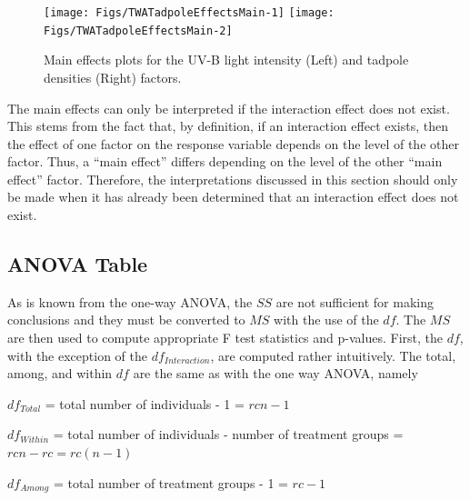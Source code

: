 \documentclass[10pt,openany]{book}\usepackage[]{graphicx}\usepackage[]{color}
\newenvironment{knitrout}{}{} %
\begin{document}
\begin{knitrout}
\color{fgcolor}\begin{figure}[!h]

{\centering \texttt{[image: Figs/TWATadpoleEffectsMain-1]} 
\texttt{[image: Figs/TWATadpoleEffectsMain-2]} 

}

\caption[Main effects plots for the UV-B light intensity (Left) and tadpole densities (Right) factors]{Main effects plots for the UV-B light intensity (Left) and tadpole densities (Right) factors.}\label{fig:TWATadpoleEffectsMain}
\end{figure}


\end{knitrout}

The main effects can only be interpreted if the interaction effect does not exist.  This stems from the fact that, by definition, if an interaction effect exists, then the effect of one factor on the response variable depends on the level of the other factor.  Thus, a ``main effect'' differs depending on the level of the other ``main effect'' factor.  Therefore, the interpretations discussed in this section should only be made when it has already been determined that an interaction effect does not exist.


\subsection{ANOVA Table}
As is known from the one-way ANOVA, the $SS$ are not sufficient for making conclusions and they must be converted to $MS$ with the use of the $df$.  The $MS$ are then used to compute appropriate F test statistics and p-values.  First, the $df$, with the exception of the $df_{Interaction}$, are computed rather intuitively.  The total, among, and within $df$ are the same as with the one way ANOVA, namely
\begin{Itemize}
  \item $df_{Total}$ = total number of individuals - 1 = $rcn-1$
  \item $df_{Within}$ = total number of individuals - number of treatment groups = $rcn - rc = rc(n-1)$
  \item $df_{Among}$ = total number of treatment groups - 1 = $rc-1$
\end{Itemize}
\end{document}
